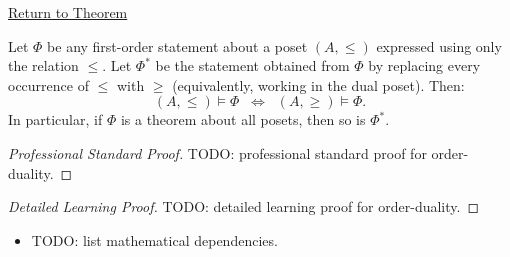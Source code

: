 \newpage
{}
\label{prf:order-duality}

\begin{remark*}[Return]
\hyperref[prop:order-duality]{Return to Theorem}
\end{remark*}

\begin{theorem*}
Let $\Phi$ be any first-order statement about a poset $(A, \leq)$ expressed
using only the relation $\leq$.  Let $\Phi^*$ be the statement obtained from
$\Phi$ by replacing every occurrence of $\leq$ with $\geq$ (equivalently,
working in the dual poset).  Then:
\[
  (A, \leq) \models \Phi
  \;\;\Longleftrightarrow\;\;
  (A, \geq) \models \Phi.
\]
In particular, if $\Phi$ is a theorem about all posets, then so is $\Phi^*$.
\end{theorem*}

\begin{proof}[Professional Standard Proof]
\LRAProofBodyStart
TODO: professional standard proof for order-duality.
\end{proof}

\begin{proof}[Detailed Learning Proof]
\LRAProofBodyStart
TODO: detailed learning proof for order-duality.
\end{proof}

\begin{remark*}
\end{remark*}

\begin{dependencies}
\begin{itemize}
  \item TODO: list mathematical dependencies.
\end{itemize}
\end{dependencies}

\clearpage
